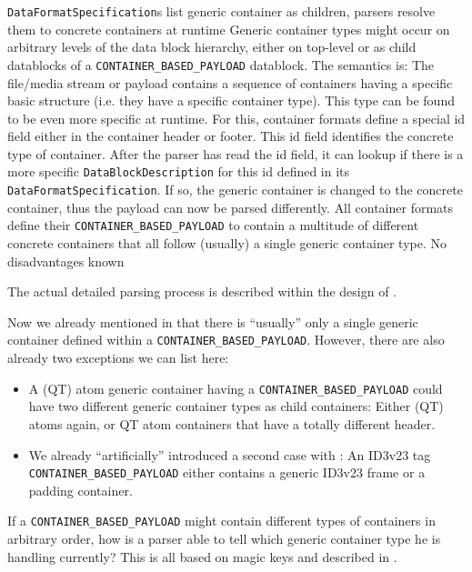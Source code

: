 {%
\texttt{DataFormatSpecification}s list generic container as children, parsers resolve them to concrete containers at runtime
}
{%
Generic container types might occur on arbitrary levels of the data block hierarchy, either on top-level or as child datablocks of a \texttt{CONTAINER\_BASED\_PAYLOAD} datablock. The semantics is: The file/media stream or payload contains a sequence of containers having a specific basic structure (i.e. they have a specific container type). This type can be found to be even more specific at runtime. For this, container formats define a special id field either in the container header or footer. This id field identifies the concrete type of container. After the parser has read the id field, it can lookup if there is a more specific \texttt{DataBlockDescription} for this id defined in its \texttt{DataFormatSpecification}. If so, the generic container is changed to the concrete container, thus the payload can now be parsed differently. 
}
{%
All container formats define their \texttt{CONTAINER\_BASED\_PAYLOAD} to contain a multitude of different concrete containers that all follow (usually) a single generic container type.
}
{%
No disadvantages known
}

The actual detailed parsing process is described within the design of \COMPdataPartManagement{}.

Now we already mentioned in  that there is ``usually'' only a single generic container defined within a \texttt{CONTAINER\_BASED\_PAYLOAD}. However, there are also already two exceptions we can list here:
\begin{itemize}
\item A (QT) atom generic container having a \texttt{CONTAINER\_BASED\_PAYLOAD} could have two different generic container types as child containers: Either (QT) atoms again, or QT atom containers that have a totally different header. 
\item We already ``artificially'' introduced a second case with : An ID3v23 tag \texttt{CONTAINER\_BASED\_PAYLOAD} either contains a generic ID3v23 frame or a padding container.
\end{itemize}

If a \texttt{CONTAINER\_BASED\_PAYLOAD} might contain different types of containers in arbitrary order, how is a parser able to tell which generic container type he is handling currently? This is all based on magic keys and described in .

